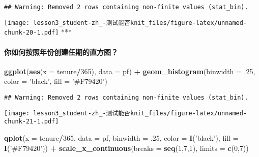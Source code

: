 \documentclass[]{article}
\newenvironment{Shaded}{\begin{snugshade}}{\end{snugshade}}
\newcommand{\DataTypeTok}[1]{\textcolor[rgb]{0.13,0.29,0.53}{#1}}
\newcommand{\DecValTok}[1]{\textcolor[rgb]{0.00,0.00,0.81}{#1}}
\newcommand{\FloatTok}[1]{\textcolor[rgb]{0.00,0.00,0.81}{#1}}
\newcommand{\KeywordTok}[1]{\textcolor[rgb]{0.13,0.29,0.53}{\textbf{#1}}}
\newcommand{\NormalTok}[1]{#1}
\newcommand{\OperatorTok}[1]{\textcolor[rgb]{0.81,0.36,0.00}{\textbf{#1}}}
\newcommand{\StringTok}[1]{\textcolor[rgb]{0.31,0.60,0.02}{#1}}
\let\oldparagraph\paragraph
\renewcommand{\paragraph}[1]{\oldparagraph{#1}\mbox{}}
\begin{document}
\begin{verbatim}
## Warning: Removed 2 rows containing non-finite values (stat_bin).
\end{verbatim}

\texttt{[image: lesson3\_student-zh\_-测试能否knit\_files/figure-latex/unnamed-chunk-20-1.pdf]}
***

\paragraph{你如何按照年份创建任期的直方图？}

\begin{Shaded}
\begin{Highlighting}[]
\KeywordTok{ggplot}\NormalTok{(}\KeywordTok{aes}\NormalTok{(}\DataTypeTok{x =}\NormalTok{ tenure}\OperatorTok{/}\DecValTok{365}\NormalTok{), }\DataTypeTok{data =}\NormalTok{ pf) }\OperatorTok{+}\StringTok{ }
\StringTok{   }\KeywordTok{geom_histogram}\NormalTok{(}\DataTypeTok{binwidth =} \FloatTok{.25}\NormalTok{, }\DataTypeTok{color =} \StringTok{'black'}\NormalTok{, }\DataTypeTok{fill =} \StringTok{'#F79420'}\NormalTok{)}
\end{Highlighting}
\end{Shaded}

\begin{verbatim}
## Warning: Removed 2 rows containing non-finite values (stat_bin).
\end{verbatim}

\texttt{[image: lesson3\_student-zh\_-测试能否knit\_files/figure-latex/unnamed-chunk-21-1.pdf]}

\begin{Shaded}
\begin{Highlighting}[]
\KeywordTok{qplot}\NormalTok{(}\DataTypeTok{x =}\NormalTok{ tenure}\OperatorTok{/}\DecValTok{365}\NormalTok{, }\DataTypeTok{data =}\NormalTok{ pf, }\DataTypeTok{binwidth =} \FloatTok{.25}\NormalTok{, }\DataTypeTok{color =} \KeywordTok{I}\NormalTok{(}\StringTok{'black'}\NormalTok{), }\DataTypeTok{fill =} \KeywordTok{I}\NormalTok{(}\StringTok{'#F79420'}\NormalTok{)) }\OperatorTok{+}
\StringTok{  }\KeywordTok{scale_x_continuous}\NormalTok{(}\DataTypeTok{breaks =} \KeywordTok{seq}\NormalTok{(}\DecValTok{1}\NormalTok{,}\DecValTok{7}\NormalTok{,}\DecValTok{1}\NormalTok{), }\DataTypeTok{limits =} \KeywordTok{c}\NormalTok{(}\DecValTok{0}\NormalTok{,}\DecValTok{7}\NormalTok{))}
\end{Highlighting}
\end{Shaded}
\end{document}
